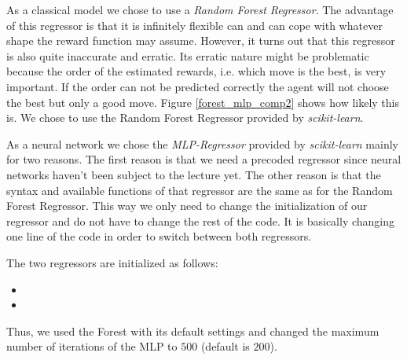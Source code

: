 	As a classical model we chose to use a \textit{Random Forest Regressor}. The advantage of this regressor is that it is infinitely flexible can and can cope with whatever shape the reward function may assume. However, it turns out that this regressor is also quite inaccurate and erratic. Its erratic nature might be problematic because the order of the estimated rewards, i.e. which move is the best, is very important. If the order can not be predicted correctly the agent will not choose the best but only a good move. Figure \ref{forest_mlp_comp2} shows how likely this is. We chose to use the Random Forest Regressor provided by \textit{scikit-learn}.\par
	
	As a neural network we chose the \textit{MLP-Regressor} provided by \textit{scikit-learn} mainly for two reasons. The first reason is that we need a precoded regressor since neural networks haven't been subject to the lecture yet. The other reason is that the syntax and available functions of that regressor are the same as for the Random Forest Regressor. This way we only need to change the initialization of our regressor and do not have to change the rest of the code. It is basically changing one line of the code in order to switch between both regressors.\par
	
	The two regressors are initialized as follows:
	\begin{itemize}
		\item {}
		\item {}
	\end{itemize}
	Thus, we used the Forest with its default settings and changed the maximum number of iterations of the MLP to $500$ (default is $200$).
	
